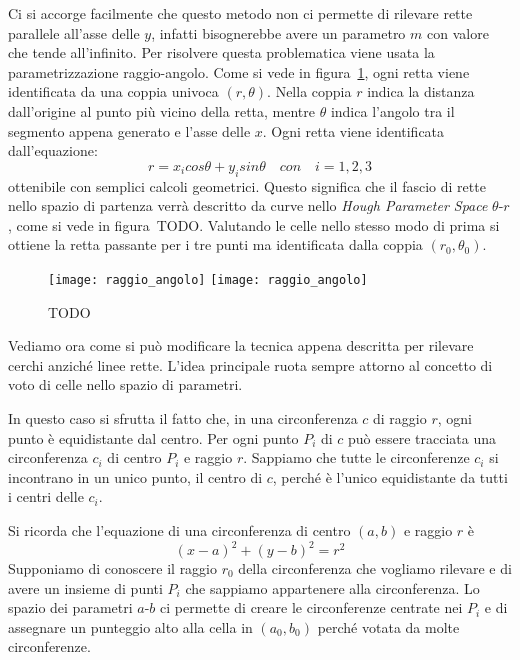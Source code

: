 Ci si accorge facilmente che questo metodo non ci permette di rilevare rette parallele all'asse delle $y$, infatti bisognerebbe avere un parametro $m$ con valore che tende all'infinito.
Per risolvere questa problematica viene usata la parametrizzazione raggio-angolo.
Come si vede in figura~\ref{fig:hough_parametr_raggio-angolo}, ogni retta viene identificata da una coppia univoca $(r,\theta)$.
Nella coppia $r$ indica la distanza dall'origine al punto più vicino della retta, mentre $\theta$ indica l'angolo tra il segmento appena generato e l'asse delle $x$.
Ogni retta viene identificata dall'equazione:
\begin{equation} \label{eq:raggio_angolo_parametr}
  r = x_i cos \theta + y_i sin \theta \quad con \quad i=1,2,3
\end{equation}
ottenibile con semplici calcoli geometrici.
Questo significa che il fascio di rette nello spazio di partenza verrà descritto da curve nello \textit{Hough Parameter Space} $\theta$-$r$, come si vede in figura~TODO.
Valutando le celle nello stesso modo di prima si ottiene la retta passante per i tre punti ma identificata dalla coppia $(r_0,\theta_0)$.

\begin{figure}[ht] %
  \begin{center}
    \texttt{[image: raggio\_angolo]}
    \texttt{[image: raggio\_angolo]}
    \caption{TODO }
    \label{fig:hough_parametr_raggio-angolo}
  \end{center}
\end{figure}


Vediamo ora come si può modificare la tecnica appena descritta per rilevare cerchi anziché linee rette.
L'idea principale ruota sempre attorno al concetto di voto di celle nello spazio di parametri.

In questo caso si sfrutta il fatto che, in una circonferenza $c$ di raggio $r$, ogni punto è equidistante dal centro.
Per ogni punto $P_i$ di $c$ può essere tracciata una circonferenza $c_i$ di centro $P_i$ e raggio $r$.
Sappiamo che tutte le circonferenze $c_i$ si incontrano in un unico punto, il centro di $c$, perché è l'unico equidistante da tutti i centri delle $c_i$.

Si ricorda che l'equazione di una circonferenza di centro $(a,b)$ e raggio $r$ è
\begin{equation} \label{eq:circonferenza}
  (x - a)^2 + (y - b)^2 = r^2
\end{equation}
Supponiamo di conoscere il raggio $r_0$ della circonferenza che vogliamo rilevare e di avere un insieme di punti $P_i$ che sappiamo appartenere alla circonferenza.
Lo spazio dei parametri $a$-$b$ ci permette di creare le circonferenze centrate nei $P_i$ e di assegnare un punteggio alto alla cella in $(a_0,b_0)$ perché votata da molte circonferenze.

